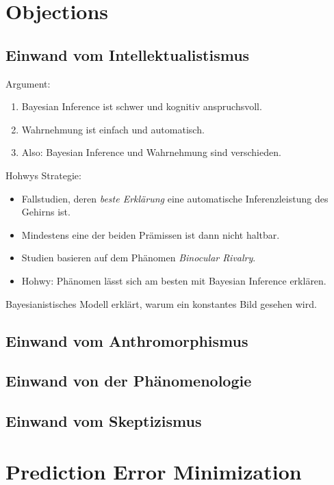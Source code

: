 \documentclass[11pt]{article}
\begin{document}
\section{Objections}

\subsection{Einwand vom Intellektualistismus}

  \noindent Argument:

  \begin{enumerate}
  \item Bayesian Inference ist schwer und kognitiv anspruchsvoll.
  \item Wahrnehmung ist einfach und automatisch.
  \item Also: Bayesian Inference und Wahrnehmung sind verschieden.
  \end{enumerate}


\noindent  Hohwys Strategie:
  \begin{itemize}
  \item Fallstudien, deren \emph{beste Erklärung} eine automatische
    Inferenzleistung des Gehirns ist.
  \item Mindestens eine der beiden Prämissen ist dann nicht haltbar.
  \item Studien basieren auf dem Phänomen \emph{Binocular Rivalry}.
  \item Hohwy: Phänomen lässt sich am besten mit Bayesian Inference
    erklären.
  \end{itemize}

\noindent  Bayesianistisches Modell erklärt, warum ein konstantes Bild gesehen
  wird.

\subsection{Einwand vom Anthromorphismus}

\subsection{Einwand von der Phänomenologie}


\subsection{Einwand vom Skeptizismus}

\section{Prediction Error Minimization}
\end{document}
